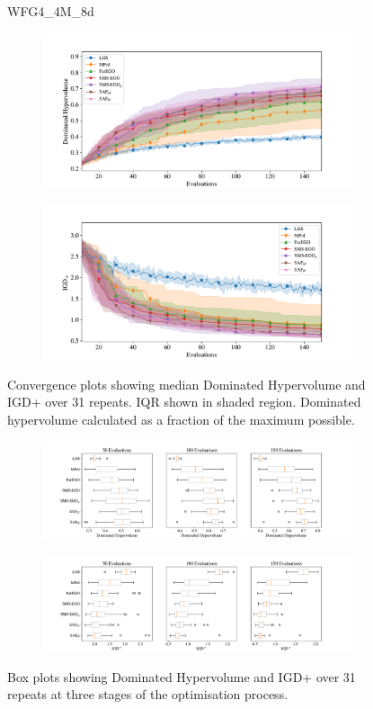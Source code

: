 \documentclass[conference]{IEEEtran}
\begin{document}
\begin{figure}
WFG4\_4M\_8d


\begin{subfigure}[hbt!]{\linewidth}

    \centering
    \includegraphics[width=0.7\linewidth]{figures/wfg4_4obj_8dim_hv_plot.pdf}
\end{subfigure}
\begin{subfigure}[h]{\linewidth}
    \centering
    \includegraphics[width=0.7\linewidth]{figures/wfg4_4obj_8dim_igd_plot.pdf}
\end{subfigure}
    \caption{Convergence plots showing median Dominated Hypervolume and IGD+ over 31 repeats. IQR shown in shaded region. Dominated hypervolume calculated as a fraction of the maximum possible.}
\vspace{\floatsep}
\begin{subfigure}[t]{\linewidth}
    \centering
    \includegraphics[width=0.8\linewidth]{figures/wfg4_4obj_8dim_hv_boxplot.pdf}
\end{subfigure}
\begin{subfigure}[t]{\linewidth}
    \centering
    \includegraphics[width=0.8\linewidth]{figures/wfg4_4obj_8dim_igd_boxplot.pdf}
\end{subfigure}
    \caption{Box plots showing Dominated Hypervolume and IGD+ over 31 repeats at three stages of the optimisation process.}
\end{figure}
\end{document}

